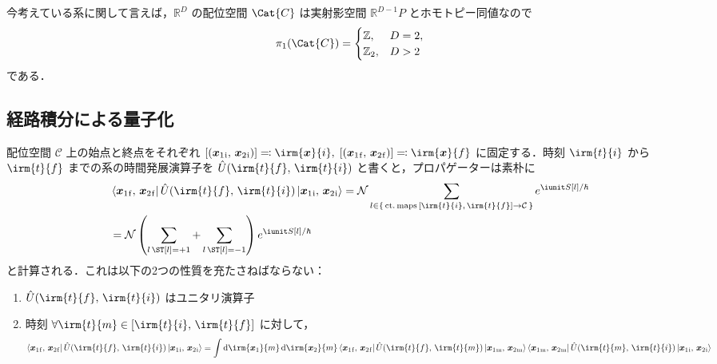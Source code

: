 \documentclass[TQFT_main]{subfiles}
\begin{document}
今考えている系に関して言えば，$\mathbb{R}^D$ の配位空間 $\Cat{C}$ は実射影空間 $\mathbb{R}^{D-1} P$ とホモトピー同値なので
\begin{align}
    \pi_1 (\Cat{C}) =
    \begin{cases}
        \mathbb{Z}, &D = 2, \\
        \mathbb{Z}_2, &D > 2
    \end{cases}
\end{align}
である．

\subsection{経路積分による量子化}

配位空間 $\mathcal{C}$ 上の始点と終点をそれぞれ $[(\bm{x}_1{}_{\mathrm{i}},\, \bm{x}_2{}_{\mathrm{i}})] \eqqcolon \irm{\bm{x}}{i},\; [(\bm{x}_1{}_{\mathrm{f}},\, \bm{x}_2{}_{\mathrm{f}})] \eqqcolon \irm{\bm{x}}{f}$ に固定する．時刻 $\irm{t}{i}$ から $\irm{t}{f}$ までの系の時間発展演算子を $\hat{U}(\irm{t}{f},\,\irm{t}{i})$ と書くと，プロパゲーターは素朴に
\begin{align}
    \label{eq:1-propagator}
    &\bra{\bm{x}_1{}_{\mathrm{f}},\, \bm{x}_2{}_{\mathrm{f}}} \hat{U}(\irm{t}{f},\, \irm{t}{i}) \ket{\bm{x}_1{}_{\mathrm{i}},\, \bm{x}_2{}_{\mathrm{i}}} = \mathcal{N} \sum_{l \in \{\, \mathrm{ct.\,maps}\, [\irm{t}{i},\, \irm{t}{f}] \to \mathcal{C}\, \}} e^{\iunit S[l]/\hbar} \\
    &= \mathcal{N} \left( \sum_{l\, \ST [l] = +1} + \sum_{l\, \ST [l] = -1} \right) e^{\iunit S[l]/\hbar} \label{eq:1-propagator-b}
\end{align}
と計算される．これは以下の2つの性質を充たさねばならない：
\begin{enumerate}
    \item $\hat{U}(\irm{t}{f},\, \irm{t}{i})$ はユニタリ演算子
    \item 時刻 $\forall \irm{t}{m} \in [\irm{t}{i},\, \irm{t}{f}]$ に対して，
    \begin{align}
        \label{eq:1-composition}
        \bra{\bm{x}_1{}_{\mathrm{f}},\, \bm{x}_2{}_{\mathrm{f}}} \hat{U}(\irm{t}{f},\, \irm{t}{i}) \ket{\bm{x}_1{}_{\mathrm{i}},\, \bm{x}_2{}_{\mathrm{i}}} = \int \dd{\irm{\bm{x}_1}{m}}\dd{\irm{\bm{x}_2}{m}} \bra{\bm{x}_1{}_{\mathrm{f}},\, \bm{x}_2{}_{\mathrm{f}}} \hat{U}(\irm{t}{f},\, \irm{t}{m}) \ket{\bm{x}_1{}_{\mathrm{m}},\, \bm{x}_2{}_{\mathrm{m}}} \bra{\bm{x}_1{}_{\mathrm{m}},\, \bm{x}_2{}_{\mathrm{m}}} \hat{U}(\irm{t}{m},\, \irm{t}{i}) \ket{\bm{x}_1{}_{\mathrm{i}},\, \bm{x}_2{}_{\mathrm{i}}}
    \end{align}
\end{enumerate}
\end{document}
